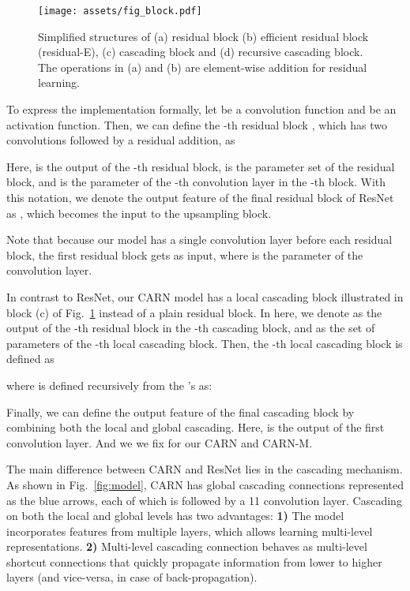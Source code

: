 \documentclass[runningheads]{llncs}
\newcommand{\red}[1]{\textcolor{red}{#1}}
\begin{document}
\begin{figure}[tbp]
    \centering
    \texttt{[image: assets/fig\_block.pdf]}
    \caption{Simplified structures of (a) residual block (b) efficient residual block (residual-E), (c) cascading block and (d) recursive cascading block. The \red{} operations in (a) and (b) are element-wise addition for residual learning.}
    \label{fig:block}
\end{figure}

To express the implementation formally, let  be a convolution function and  be an activation function. Then, we can define the -th residual block , which has two convolutions followed by a residual addition, as


Here,  is the output of the -th residual block,  is the parameter set of the residual block, and  is the parameter of the -th convolution layer in the -th block. With this notation, we denote the output feature of the final residual block of ResNet as , which becomes the input to the upsampling block.


Note that because our model has a single convolution layer before each residual block, the first residual block gets  as input, where  is the parameter of the convolution layer.

In contrast to ResNet, our CARN model has a local cascading block illustrated in block (c) of Fig.~\ref{fig:block} instead of a plain residual block. In here, we denote  as the output of the -th residual block in the -th cascading block, and  as the set of parameters of the -th local cascading block. Then, the -th local cascading block  is defined as

where  is defined recursively from the 's as:


Finally, we can define the output feature of the final cascading block  by combining both the local and global cascading. Here,  is the output of the first convolution layer. And we we fix  for our CARN and CARN-M.


The main difference between CARN and ResNet lies in the cascading mechanism. As shown in Fig.~\ref{fig:model}, CARN has global cascading connections represented as the blue arrows, each of which is followed by a 11 convolution layer. Cascading on both the local and global levels has two advantages: \textbf{1)} The model incorporates features from multiple layers, which allows learning multi-level representations. \textbf{2)} Multi-level cascading connection behaves as multi-level shortcut connections that quickly propagate information from lower to higher layers (and vice-versa, in case of back-propagation).
\end{document}
